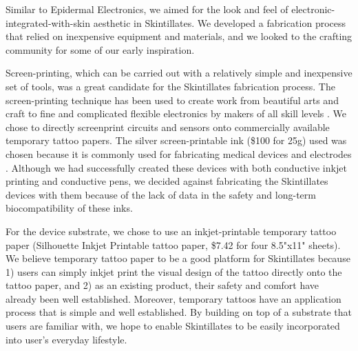 \documentclass{sigchi}
\begin{document}
Similar to Epidermal Electronics, we aimed for the look and feel of electronic-integrated-with-skin aesthetic in Skintillates. We developed a fabrication process that relied on inexpensive equipment and materials, and we looked to the crafting community for some of our early inspiration. 

Screen-printing, which can be carried out with a relatively simple and inexpensive set of tools, was a great candidate for the Skintillates fabrication process. The screen-printing technique has been used to create work from beautiful arts and craft to fine and complicated flexible electronics by makers of all skill levels \cite{Olberding:2014ds,Perry:CXGigkdt,Dillon:2008uc}. We chose to directly screenprint circuits and sensors onto commercially available temporary tattoo papers. The silver screen-printable ink (\$100 for 25g) used was chosen because it is commonly used for fabricating medical devices and electrodes \cite{Cristea:2009uq,Rattfalt:2013ts}. Although we had successfully created these devices with both conductive inkjet printing and conductive pens, we decided against fabricating the Skintillates devices with them because of the lack of data in the safety and long-term biocompatibility of these inks. 

For the device substrate, we chose to use an inkjet-printable temporary tattoo paper (Silhouette Inkjet Printable tattoo paper, \$7.42 for four 8.5"x11" sheets). We believe temporary tattoo paper to be a good platform for Skintillates because 1) users can simply inkjet print the visual design of the tattoo directly onto the tattoo paper, and 2) as an existing product, their safety and comfort have already been well established. Moreover, temporary tattoos have an application process that is simple and well established. By building on top of a substrate that users are familiar with, we hope to enable Skintillates to be easily incorporated into user's everyday lifestyle.
\end{document}
